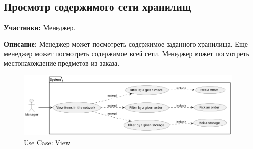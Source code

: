\subsection{Просмотр содержимого сети хранилищ}

\textbf{Участники:}
Менеджер.

\textbf{Описание:}
Менеджер может посмотреть содержимое заданного хранилища.
Еще менеджер может посмотреть содержимое всей сети.
Менеджер может посмотреть местонахождение предметов из заказа.

\begin{figure}[h]
  \centering
  \includegraphics[width=12cm]{../../doc/spec/figure/usecase/view/Storage Net, Use Case, View Content.png}
  \caption{Use Case: View}
\end{figure}